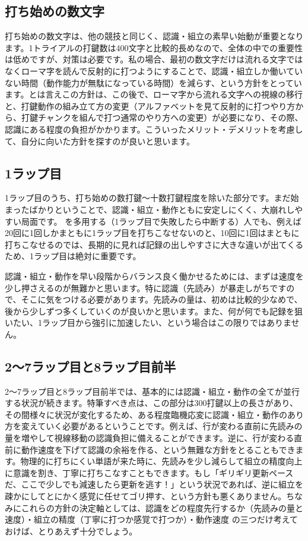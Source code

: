 \subsection{打ち始めの数文字}

打ち始めの数文字は、他の競技と同じく、認識・組立の素早い始動が重要となります。1トライアルの打鍵数は400文字と比較的長めなので、全体の中での重要性は低めですが、対策は必要です。私の場合、最初の数文字だけは流れる文字ではなくローマ字を読んで反射的に打つようにすることで、認識・組立しか働いていない時間（動作能力が無駄になっている時間）を減らす、という方針をとっています。とは言えこの方針は、この後で、ローマ字から流れる文字への視線の移行と、打鍵動作の組み立て方の変更（アルファベットを見て反射的に打つやり方から、打鍵チャンクを組んで打つ通常のやり方への変更）が必要になり、その際、認識にある程度の負担がかかります。こういったメリット・デメリットを考慮して、自分に向いた方針を探すのが良いと思います。

\subsection{1ラップ目}

1ラップ目のうち、打ち始めの数打鍵～十数打鍵程度を除いた部分です。まだ始まったばかりということで、認識・組立・動作ともに安定しにくく、大崩れしやすい局面です。 を多用する（1ラップ目で失敗したら中断する）人でも、例えば20回に1回しかまともに1ラップ目を打ちこなせないのと、10回に1回はまともに打ちこなせるのでは、長期的に見れば記録の出しやすさに大きな違いが出てくるため、1ラップ目は絶対に重要です。

認識・組立・動作を早い段階からバランス良く働かせるためには、まずは速度を少し押さえるのが無難かと思います。特に認識（先読み）が暴走しがちですので、そこに気をつける必要があります。先読みの量は、初めは比較的少なめで、後から少しずつ多くしていくのが良いかと思います。また、何が何でも記録を狙いたい、1ラップ目から強引に加速したい、という場合はこの限りではありません。

\subsection{2～7ラップ目と8ラップ目前半}

2～7ラップ目と8ラップ目前半では、基本的には認識・組立・動作の全てが並行する状況が続きます。特筆すべき点は、この部分は300打鍵以上の長さがあり、その間様々に状況が変化するため、ある程度臨機応変に認識・組立・動作のあり方を変えていく必要があるということです。例えば、行が変わる直前に先読みの量を増やして視線移動の認識負担に備えることができます。逆に、行が変わる直前に動作速度を下げて認識の余裕を作る、という無難な方針をとることもできます。物理的に打ちにくい単語が来た時に、先読みを少し減らして組立の精度向上に意識を割き、丁寧に打ちこなすこともできます。もし「ギリギリ更新ペースだ、ここで少しでも減速したら更新を逃す！」という状況であれば、逆に組立を疎かにしてとにかく感覚に任せてゴリ押す、という方針も悪くありません。ちなみにこれらの方針の決定軸としては、認識をどの程度先行するか（先読みの量と速度）・組立の精度（丁寧に打つか感覚で打つか）・動作速度 の三つだけ考えておけば、とりあえず十分でしょう。

